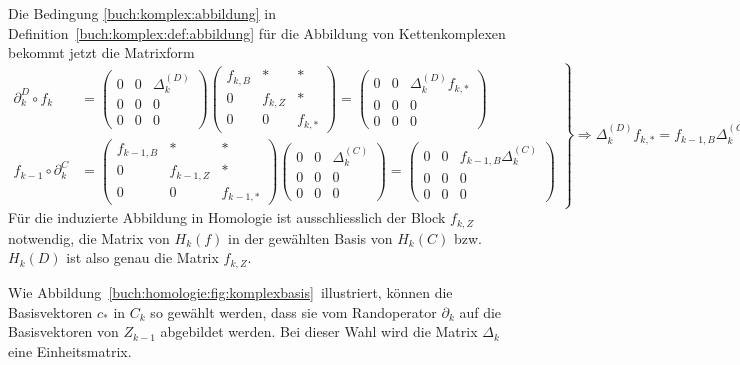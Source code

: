 Die Bedingung \eqref{buch:komplex:abbildung} in Definition~\ref{buch:komplex:def:abbildung}
für die Abbildung von Kettenkomplexen
bekommt jetzt die Matrixform
\begin{equation}
\left.
\begin{aligned}
\partial_k^{D}\circ f_k
&=
\begin{pmatrix}
0&0&\Delta_k^{(D)}\\
0&0&0\\
0&0&0
\end{pmatrix}
\begin{pmatrix}
f_{k,B} &    *    & * \\
   0    & f_{k,Z} & * \\
   0    &    0    & f_{k,*}
\end{pmatrix}
=
\begin{pmatrix}
0&0&\Delta_k^{(D)}f_{k,*}\\
0&0&0\\
0&0&0
\end{pmatrix}
\\
f_{k-1}\circ \partial_k^C
&=
\begin{pmatrix}
f_{k-1,B}&   *   &   *   \\
   0   &f_{k-1,Z}&   *   \\
   0   &   0   &f_{k-1,*}
\end{pmatrix}
\begin{pmatrix}
0&0&\Delta_k^{(C)}\\
0&0&0\\
0&0&0
\end{pmatrix}
=
\begin{pmatrix}
0&0&f_{k-1,B}\Delta_k^{(C)}\\
0&0&0\\
0&0&0
\end{pmatrix}
\end{aligned}
\right\}
\Rightarrow
\Delta_k^{(D)}f_{k,*}
=
f_{k-1,B}\Delta_k^{(C)}.
\label{buch:homologie:matrixform}
\end{equation}
Für die induzierte Abbildung in Homologie ist ausschliesslich der
Block $f_{k,Z}$ notwendig, die Matrix von $H_k(f)$ in der gewählten
Basis von $H_k(C)$ bzw.~$H_k(D)$ ist also genau die Matrix $f_{k,Z}$.


Wie Abbildung~\ref{buch:homologie:fig:komplexbasis} illustriert, können die
Basisvektoren $c_*$ in $C_k$ so gewählt werden, dass sie vom Randoperator
$\partial_k$ auf die Basisvektoren von $Z_{k-1}$ abgebildet werden.
Bei dieser Wahl wird die Matrix $\Delta_k$ eine Einheitsmatrix.

